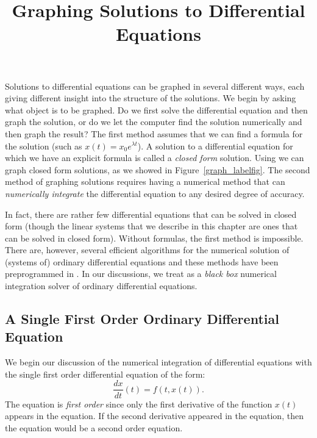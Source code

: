 \documentclass{ximera}
\title{Graphing Solutions to Differential Equations}
\begin{document}
\begin{abstract}
\end{abstract}
\maketitle


\label{S:3.2}

Solutions to differential equations can be graphed in several
different ways, each giving different insight into the structure
of the solutions.  We begin by asking what object is to be
graphed.  Do we first solve the differential equation and then
graph the solution, or do we let the computer find the solution
numerically and then graph the result?  The first method assumes
that we can find a formula for the solution (such as
$x(t)=x_0e^{\lambda t}$).  A solution to a differential equation
for which we have an explicit formula is called a {\em closed
form\/} solution.  Using \Matlab we
can graph closed form solutions, as we showed in
Figure~\ref{graph_labelfig}. The second method of graphing
solutions requires having a numerical method that can {\em
numerically integrate\/} the differential equation to any
desired degree of accuracy.

In fact, there are rather few differential equations that can be
solved in closed form (though the linear systems that we
describe in this chapter are ones that can be solved in closed
form).  Without formulas, the first method is impossible.  There
are, however, several efficient algorithms for the numerical
solution of (systems of) ordinary differential equations and
these methods have been preprogrammed in \Matlabp.  In our
discussions, we treat \Matlab as a {\em black box\/} numerical
integration solver of ordinary differential equations.

\subsection*{A Single First Order Ordinary Differential Equation}

We begin our discussion of the numerical integration of
differential equations with the single first order  differential equation
of the form:
\begin{equation} \label{nonaut}
\frac{dx}{dt}(t) = f(t,x(t)).
\end{equation}
The equation is {\em first order\/} since only the first
derivative of the function $x(t)$ appears in the equation. If
the second derivative appeared in the equation, then the equation
would be a second order equation.
\end{document}

